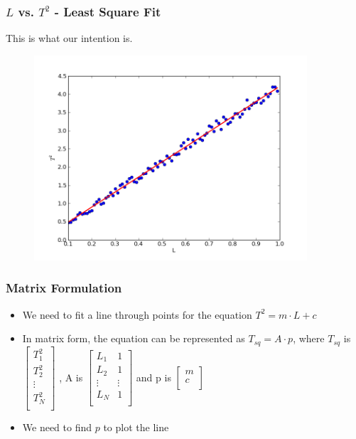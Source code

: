 \begin{frame}[fragile]
\frametitle{$L$ vs. $T^2$ - Least Square Fit}
This is what our intention is.
\begin{figure}
\includegraphics[width=4in]{data/least-sq-fit}
\end{figure}
\end{frame}

\begin{frame}[fragile]
  \frametitle{Matrix Formulation}
  \begin{itemize}
  \item We need to fit a line through points for the equation $T^2 = m \cdot L+c$
  \item In matrix form, the equation can be represented as $T_{sq} = A \cdot p$, where $T_{sq}$ is
    $\begin{bmatrix}
    T^2_1 \\
    T^2_2 \\
    \vdots\\
    T^2_N \\
  \end{bmatrix}$
    , A is   
    $\begin{bmatrix}
    L_1 & 1 \\
    L_2 & 1 \\
    \vdots & \vdots\\
    L_N & 1 \\
  \end{bmatrix}$
    and p is 
    $\begin{bmatrix}
      m\\
      c\\
    \end{bmatrix}$
  \item We need to find $p$ to plot the line
  \end{itemize}
\end{frame}

